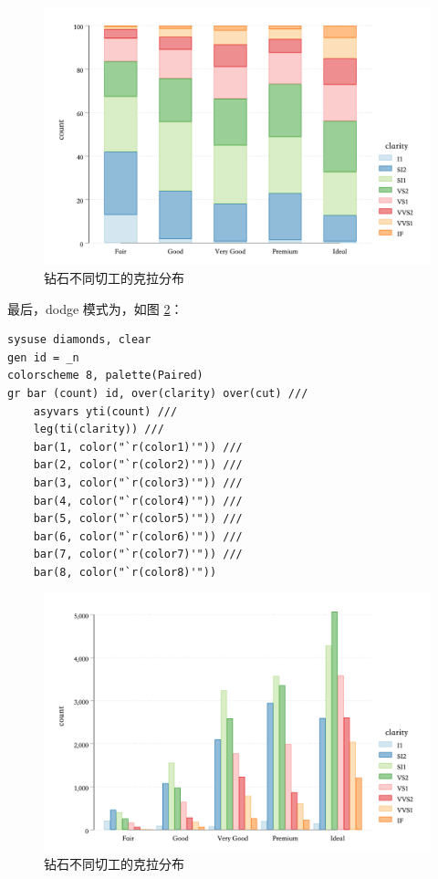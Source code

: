 \begin{figure}[htbp]
  \centering \includegraphics[width=\textwidth]{assets/percentcutclarity.png}
  \caption{钻石不同切工的克拉分布}\label{fig:percentcutclarity}
\end{figure}

最后，\textcolor{third2}{dodge} 模式为，如图 \ref{fig:dodgecutclarity}：

\begin{lstlisting}
sysuse diamonds, clear
gen id = _n
colorscheme 8, palette(Paired)
gr bar (count) id, over(clarity) over(cut) ///
    asyvars yti(count) ///
    leg(ti(clarity)) ///
    bar(1, color("`r(color1)'")) ///
    bar(2, color("`r(color2)'")) ///
    bar(3, color("`r(color3)'")) ///
    bar(4, color("`r(color4)'")) ///
    bar(5, color("`r(color5)'")) ///
    bar(6, color("`r(color6)'")) ///
    bar(7, color("`r(color7)'")) ///
    bar(8, color("`r(color8)'"))
\end{lstlisting}

\begin{figure}[htbp]
  \centering \includegraphics[width=\textwidth]{assets/dodgecutclarity.png}
  \caption{钻石不同切工的克拉分布}\label{fig:dodgecutclarity}
\end{figure}

